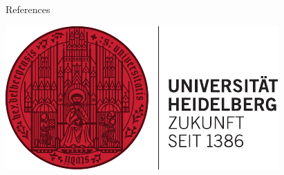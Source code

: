 \documentclass[final]{beamer}
\newlength{\onecolwid}
\begin{document}
\begin{frame}[t]
\begin{columns}[t]
\begin{column}{\onecolwid}
\begin{block}{References}

\small{
\vspace{0.75in}}

\end{block}


%



\begin{flushright}
\includegraphics[width=0.4\linewidth]{logo_hd.pdf}
\end{flushright}


\end{column} %

\end{columns} %

\end{frame} %
\end{document}

